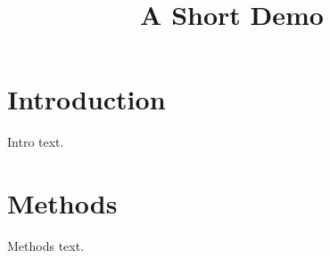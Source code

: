 \documentclass[article]{jss}
\title{A Short Demo}
\begin{document}
\section{Introduction}
Intro text.
\section{Methods}
Methods text.

\end{document}
